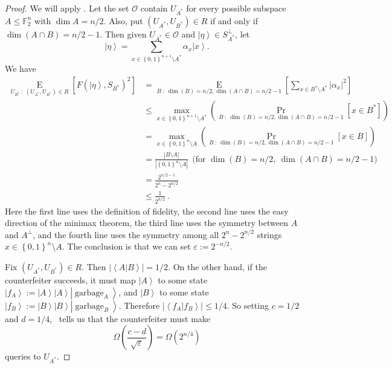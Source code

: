 \begin{proof}
We will apply . Let the set $\mathcal{O}$ contain
$U_{A^{\ast}}$ for every possible subspace $A\leq\mathbb{F}_{2}^{n}$ with
$\dim A=n/2$. Also, put $\left(  U_{A^{\ast}},U_{B^{\ast}}\right)  \in
R$ if and only if $\dim\left(  A\cap B\right)  =n/2-1$. Then given
$U_{A^{\ast}}\in\mathcal{O}$ and $\left\vert \eta\right\rangle \in
S_{A^{\ast}}^{\bot}$, let%
\[
\left\vert \eta\right\rangle =\sum_{x\in\left\{  0,1\right\}  ^{n+1}\setminus
A^{\ast}}\alpha_{x}\left\vert x\right\rangle .
\]
We have%
\begin{align*}
\operatorname*{E}_{U_{B^{\ast}}~:~\left(  U_{A^{\ast}},U_{B^{\ast}}\right)
\in R}\left[  F\left(  \left\vert \eta\right\rangle ,S_{B^{\ast}}\right)
^{2}\right]   &  =\operatorname*{E}_{B~:~\dim\left(  B\right)  =n/2,\dim
\left(  A\cap B\right)  =n/2-1}\left[  \sum_{x\in B^{\ast}\setminus A^{\ast}%
}\left\vert \alpha_{x}\right\vert ^{2}\right] \\
&  \leq\max_{x\in\left\{  0,1\right\}  ^{n+1}\setminus A^{\ast}}\left(
\Pr_{B~:~\dim\left(  B\right)  =n/2,\dim\left(  A\cap B\right)  =n/2-1}\left[
x\in B^{\ast}\right]  \right) \\
&  =\max_{x\in\left\{  0,1\right\}  ^{n}\setminus A}\left(  \Pr_{B~:~\dim
\left(  B\right)  =n/2,\dim\left(  A\cap B\right)  =n/2-1}\left[  x\in
B\right]  \right) \\
&  =\frac{\left\vert B\setminus A\right\vert }{\left\vert \left\{
0,1\right\}  ^{n}\setminus A\right\vert }~~\text{(for }\dim\left(  B\right)
=n/2,~\dim\left(  A\cap B\right)  =n/2-1\text{)}\\
&  =\frac{2^{n/2-1}}{2^{n}-2^{n/2}}\\
&  \leq\frac{1}{2^{n/2}}\,.
\end{align*}
Here the first line uses the definition of fidelity, the second line uses the
easy direction of the minimax theorem, the third line uses the symmetry
between $A$ and $A^{\bot}$, and the fourth line uses the symmetry among all
$2^{n}-2^{n/2}$ strings\ $x\in\left\{  0,1\right\}  ^{n}\setminus A$. The
conclusion is that we can set $\varepsilon:=2^{-n/2}$.

Fix $\left(  U_{A^{\ast}},U_{B^{\ast}}\right)  \in R$. Then $\left\vert
\left\langle A|B\right\rangle \right\vert =1/2$. On the other hand, if the
counterfeiter succeeds, it must map $\left\vert A\right\rangle $ to some
state $\left\vert f_{A}\right\rangle :=\left\vert A\right\rangle \left\vert
A\right\rangle \left\vert \operatorname{garbage}_{A}\right\rangle $, and
$\left\vert B\right\rangle $ to some state $\left\vert f_{B}\right\rangle
:=\left\vert B\right\rangle \left\vert B\right\rangle \left\vert
\operatorname{garbage}_{B}\right\rangle $. Therefore $\left\vert
\left\langle f_{A}|f_{B}\right\rangle \right\vert \leq1/4$. So setting
$c=1/2$ and $d=1/4$, \ tells us that the counterfeiter
must make%
\[
\Omega\left(  \frac{c-d}{\sqrt{\varepsilon}}\right)  =\Omega\left(
2^{n/4}\right)
\]
queries to $U_{A^{\ast}}$.
\end{proof}

